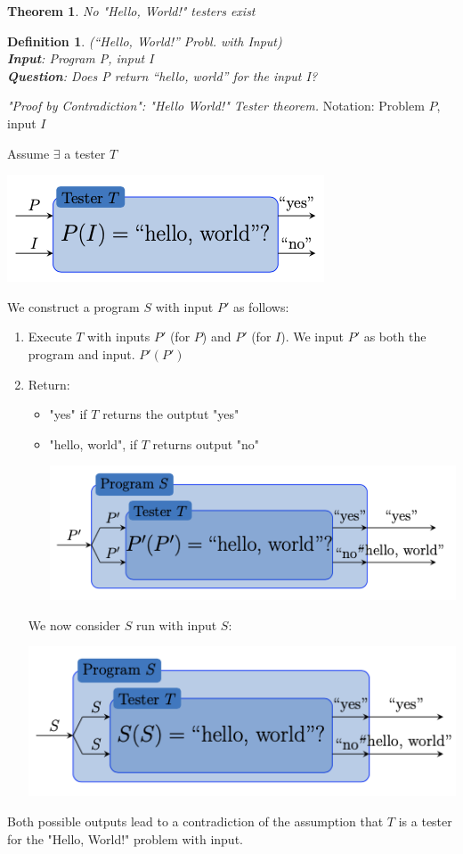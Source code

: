 \documentclass[a3paper, 8pt]{extarticle}
\newtheorem*{theorem*}{Theorem}
\newtheorem*{definition}{Definition}
\begin{document}
\begin{multicols*}{6}
\begin{theorem*}
     No "Hello, World!" testers exist
\end{theorem*}

\begin{definition}
     (“Hello, World!” Probl. with Input)\\
     \textbf{Input}: Program P, input I\\
\textbf{Question}: Does P return “hello, world” for the input I?
\end{definition}

\textit{"Proof by Contradiction": "Hello World!" Tester theorem.} Notation: Problem $P$, input $I$

Assume $\exists$ a tester $T$ 

\begin{center}
    \includegraphics[width=0.55\columnwidth]{images/Screen Shot 2022-12-29 at 14.11.11.png}
\end{center}
 We construct a program $S$ with input $P'$ as follows: \begin{enumerate}
     \item Execute $T$ with inputs $P'$ (for $P$) and $P'$ (for $I$). We input $P'$ as both the program and input. $P'(P')$ 
     \item Return: \begin{itemize}
         \item "yes" if $T$ returns the outptut "yes"
         \item "hello, world", if $T$ returns output "no"
         \begin{center}
             \includegraphics[width=0.7 \columnwidth]{images/Screen Shot 2022-12-29 at 14.16.42.png}
         \end{center}
     \end{itemize}
     We now consider $S$ run with input $S$:
     \begin{center}
             \includegraphics[width=0.7 \columnwidth]{images/Screen Shot 2022-12-29 at 14.19.19.png}
         \end{center}
 \end{enumerate}
 Both possible outputs lead to a contradiction of the assumption that $T$ is a tester for the "Hello, World!" problem with input. 


\end{multicols*}
\end{document}
